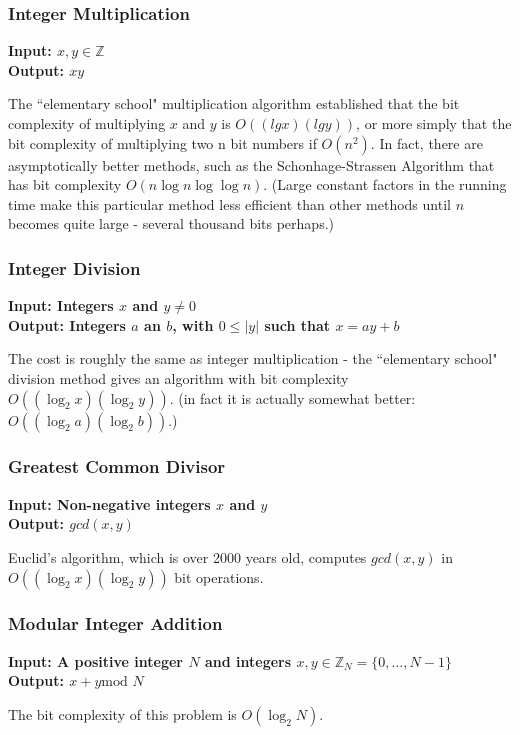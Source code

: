 \subsubsection{Integer Multiplication}
\textbf{Input: $x,y \in \mathbb{Z}$}\\
\textbf{Output: $xy$}

The ``elementary school" multiplication algorithm established that the bit complexity of multiplying $x$ and $y$ is $O((lg x)(lg y))$, or more simply that the bit complexity of multiplying two n bit numbers if $O(n^2)$. In fact, there are asymptotically better methods, such as the Schonhage-Strassen Algorithm that has bit complexity $O(n\log n \log \log n)$. (Large constant factors in the running time make this particular method less efficient than other methods until $n$ becomes quite large - several thousand bits perhaps.)

\subsubsection{Integer Division}
\textbf{Input: Integers $x$ and $y\neq 0$}\\
\textbf{Output: Integers $a$ an $b$, with $0\leq |y|$ such that $x=ay+b$}

 The cost is roughly the same as integer multiplication - the ``elementary school" division method gives an algorithm with bit complexity $O((\log_2 x)(\log_2 y))$. (in fact it is actually somewhat better: $O((\log_2 a)(\log_2 b))$.)

\subsubsection{Greatest Common Divisor}
\textbf{Input: Non-negative integers $x$ and $y$}\\
\textbf{Output: $gcd(x,y)$}

Euclid's algorithm, which is over 2000 years old, computes $gcd(x,y)$ in $O((\log_2 x) (\log_2 y))$ bit operations.

\subsubsection{Modular Integer Addition}
\textbf{Input: A positive integer $N$ and integers $x,y \in \mathbb{Z}_N = \{0,\ldots,N-1\}$}\\
\textbf{Output: $x+y \text{mod $N$}$}

The bit complexity of this problem is $O(\log_2 N)$.

